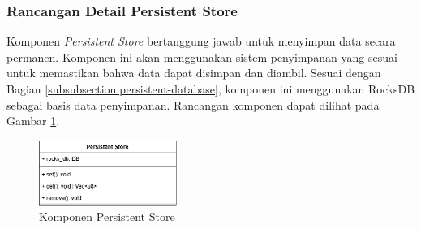 \subsubsection{Rancangan Detail Persistent Store}
\label{subsubsection:detail-persistent-store}

Komponen \textit{Persistent Store} bertanggung jawab untuk menyimpan data secara permanen. Komponen ini akan menggunakan sistem penyimpanan yang sesuai untuk memastikan bahwa data dapat disimpan dan diambil. Sesuai dengan Bagian \ref{subsubsection:persistent-database}, komponen ini menggunakan RocksDB sebagai basis data penyimpanan. Rancangan komponen dapat dilihat pada Gambar \ref{fig:persistent-store-component}.

\begin{figure}[ht]
	\centering
	\includegraphics[width=0.4\textwidth]{resources/chapter-3/persistent-store-component.png}
	\caption{Komponen Persistent Store}
	\label{fig:persistent-store-component}
\end{figure}